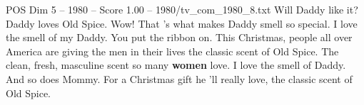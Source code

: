 \begin{textsample}{POS Dim 5 – 1980 – Score 1.00 – 1980/tv\_com\_1980\_8.txt}  \label{ex:f5_pos_020}
Will Daddy like it?
Daddy loves Old Spice.
Wow!
That 's what makes Daddy smell so special.
I love the smell of my Daddy.
You put the ribbon on.
This Christmas, people all over America are giving the men in their lives the classic scent of Old Spice.
The clean, fresh, masculine scent so many \textbf{women} love.
I love the smell of Daddy.
And so does Mommy.
For a Christmas gift he 'll really love, the classic scent of Old Spice.

\end{textsample}
